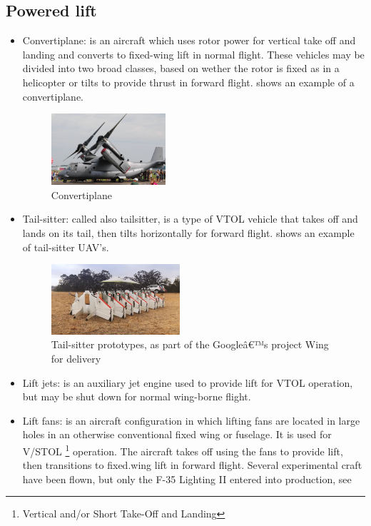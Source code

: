 \subsection{Powered lift}
\begin{itemize}
  \item Convertiplane: is an aircraft which uses rotor power for vertical take off and landing and converts to fixed-wing lift in normal flight. These vehicles may be divided into two broad classes, based on wether the rotor is fixed as in a helicopter or tilts to provide thrust in forward flight.  shows an example of a convertiplane.

      \begin{figure}[h!]
        \centering
        \includegraphics[width=0.4\textwidth]{figures/converti.jpg}
        \caption{Convertiplane}\label{convert}
      \end{figure}

  \item Tail-sitter: called also tailsitter, is a type of VTOL vehicle that takes off and lands on its tail, then tilts horizontally for forward flight.  shows an example of tail-sitter UAV's.

      \begin{figure}[h!]
        \centering
        \includegraphics[width=0.45\textwidth]{figures/tail.png}
        \caption{Tail-sitter prototypes, as part of the Googleâ€™s project Wing for delivery}\label{tail}
      \end{figure}

  \item Lift jets: is an auxiliary jet engine used to provide lift for VTOL operation, but may be shut down for normal wing-borne flight.
  \item Lift fans: is an aircraft configuration in which lifting fans are located in large holes in an otherwise conventional fixed wing or fuselage. It is used for V/STOL \footnote{Vertical and/or Short Take-Off and Landing} operation. The aircraft takes off using the fans to provide lift, then transitions to fixed.wing lift in forward flight. Several experimental craft have been flown, but only the F-35 Lighting II entered into production, see 


\end{itemize}
